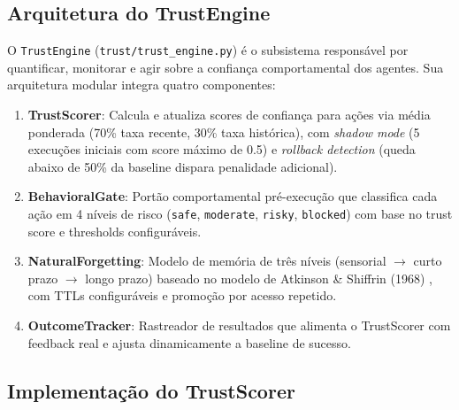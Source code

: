 \subsection{Arquitetura do TrustEngine}

O \texttt{TrustEngine} (\texttt{trust/trust\_engine.py}) é o subsistema responsável por quantificar, monitorar e agir sobre a confiança comportamental dos agentes. Sua arquitetura modular integra quatro componentes:

\begin{enumerate}
    \item \textbf{TrustScorer}: Calcula e atualiza scores de confiança para ações via média ponderada (70\% taxa recente, 30\% taxa histórica), com \textit{shadow mode} (5 execuções iniciais com score máximo de 0.5) e \textit{rollback detection} (queda abaixo de 50\% da baseline dispara penalidade adicional).
    
    \item \textbf{BehavioralGate}: Portão comportamental pré-execução que classifica cada ação em 4 níveis de risco (\texttt{safe}, \texttt{moderate}, \texttt{risky}, \texttt{blocked}) com base no trust score e thresholds configuráveis.
    
    \item \textbf{NaturalForgetting}: Modelo de memória de três níveis (sensorial $\rightarrow$ curto prazo $\rightarrow$ longo prazo) baseado no modelo de Atkinson \& Shiffrin (1968) \cite{Atkinson1968_Memory}, com TTLs configuráveis e promoção por acesso repetido.
    
    \item \textbf{OutcomeTracker}: Rastreador de resultados que alimenta o TrustScorer com feedback real e ajusta dinamicamente a baseline de sucesso.
\end{enumerate}

\subsection{Implementação do TrustScorer}

